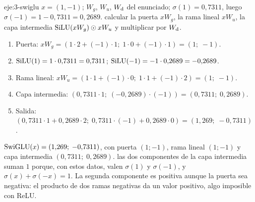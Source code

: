 \begin{solucion}{eje:3-swiglu}
\datos $x=(1,-1)$; $W_g$, $W_u$, $W_{\mathrm{d}}$ del enunciado; $\sigma(1)=0{,}7311$, luego $\sigma(-1)=1-0{,}7311=0{,}2689$.
\planteamiento calcular la puerta $xW_g$, la rama lineal $xW_u$, la capa intermedia $\operatorname{SiLU}(xW_g)\odot xW_u$ y multiplicar por $W_{\mathrm{d}}$.
\pasos
\begin{enumerate}[label=\arabic*.]
  \item Puerta: $xW_g=(1\cdot 2+(-1)\cdot 1;\;1\cdot 0+(-1)\cdot 1)=(1;\;-1)$.
  \item $\operatorname{SiLU}(1)=1\cdot 0{,}7311=0{,}7311$; $\operatorname{SiLU}(-1)=-1\cdot 0{,}2689=-0{,}2689$.
  \item Rama lineal: $xW_u=(1\cdot 1+(-1)\cdot 0;\;1\cdot 1+(-1)\cdot 2)=(1;\;-1)$.
  \item Capa intermedia: $(0{,}7311\cdot 1;\;(-0{,}2689)\cdot(-1))=(0{,}7311;\;0{,}2689)$.
  \item Salida: $(0{,}7311\cdot 1+0{,}2689\cdot 2;\;0{,}7311\cdot(-1)+0{,}2689\cdot 0)=(1{,}269;\;-0{,}7311)$.
\end{enumerate}
\resultado \textbf{$\operatorname{SwiGLU}(x)=(1{,}269;\;-0{,}7311)$}, con puerta $(1;-1)$, rama lineal $(1;-1)$ y capa intermedia $(0{,}7311;\;0{,}2689)$.
\comprobacion las dos componentes de la capa intermedia suman $1$ porque, con estos datos, valen $\sigma(1)$ y $\sigma(-1)$, y $\sigma(x)+\sigma(-x)=1$. La segunda componente es positiva aunque la puerta sea negativa: el producto de dos ramas negativas da un valor positivo, algo imposible con ReLU.
\end{solucion}

